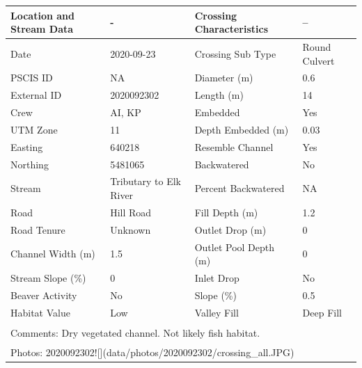 \documentclass[
]{book}
\begin{document}
\begin{tabular}{l|l|l|l}
\hline
Location and Stream Data & - & Crossing Characteristics & --\\
\hline
Date & 2020-09-23 & Crossing Sub Type & Round Culvert\\
\hline
PSCIS ID & NA & Diameter (m) & 0.6\\
\hline
External ID & 2020092302 & Length (m) & 14\\
\hline
Crew & AI, KP & Embedded & Yes\\
\hline
UTM Zone & 11 & Depth Embedded (m) & 0.03\\
\hline
Easting & 640218 & Resemble Channel & Yes\\
\hline
Northing & 5481065 & Backwatered & No\\
\hline
Stream & Tributary to Elk River & Percent Backwatered & NA\\
\hline
Road & Hill Road & Fill Depth (m) & 1.2\\
\hline
Road Tenure & Unknown & Outlet Drop (m) & 0\\
\hline
Channel Width (m) & 1.5 & Outlet Pool Depth (m) & 0\\
\hline
Stream Slope (\%) & 0 & Inlet Drop & No\\
\hline
Beaver Activity & No & Slope (\%) & 0.5\\
\hline
Habitat Value & Low & Valley Fill & Deep Fill\\
\hline
\multicolumn{4}{l}{\textsuperscript{} Comments: Dry vegetated channel. Not likely fish habitat.}\\
\multicolumn{4}{l}{\textsuperscript{} Photos: 2020092302![](data/photos/2020092302/crossing\_all.JPG)}\\
\end{tabular}
\end{document}
